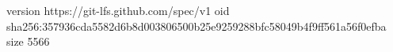 version https://git-lfs.github.com/spec/v1
oid sha256:357936cda5582d6b8d003806500b25e9259288bfc58049b4f9ff561a56f0efba
size 5566

